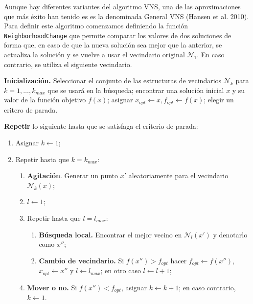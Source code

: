 \documentclass[
]{article}
\providecommand{\tightlist}{%
  \setlength{\itemsep}{0pt}\setlength{\parskip}{0pt}}
\begin{document}
Aunque hay diferentes variantes del algoritmo VNS, una de las
aproximaciones que más éxito han tenido es es la denominada General VNS
(Hansen et al. 2010). Para definir este algoritmo comenzamos definiendo
la función \texttt{NeighborhoodChange} que permite comparar los valores
de dos soluciones de forma que, en caso de que la nueva solución sea
mejor que la anterior, se actualiza la solución y se vuelve a usar el
vecindario original \(\mathcal{N}_1\). En caso contrario, se utiliza el
siguiente vecindario.

\textbf{Inicialización.} Seleccionar el conjunto de las estructuras de
vecindarios \(\mathcal{N}_k\) para \(k=1,\ldots, k_{max}\) que se usará
en la búsqueda; encontrar una solución inicial \(x\) y su valor de la
función objetivo \(f(x)\); asignar
\(x_{opt}\leftarrow x, f_{opt}\leftarrow f(x)\); elegir un critero de
parada.

\textbf{Repetir} lo siguiente hasta que se satisfaga el criterio de
parada:

\begin{enumerate}
\def\labelenumi{(\arabic{enumi})}
\tightlist
\item
  Asignar \(k\leftarrow 1\);
\item
  Repetir hasta que \(k=k_{max}\):

  \begin{enumerate}
  \def\labelenumii{(\alph{enumii})}
  \tightlist
  \item
    \textbf{Agitación}. Generar un punto \(x'\) aleatoriamente para el
    vecindario \(\mathcal{N}_k(x)\);
  \item
    \(l\leftarrow 1\);
  \item
    Repetir hasta que \(l=l_{max}\):

    \begin{enumerate}
    \def\labelenumiii{(\roman{enumiii})}
    \tightlist
    \item
      \textbf{Búsqueda local.} Encontrar el mejor vecino en
      \(\mathcal{N}_l(x')\) y denotarlo como \(x''\);
    \item
      \textbf{Cambio de vecindario.} Si \(f(x'') > f_{opt}\) hacer
      \(f_{opt}\leftarrow f(x'')\), \(x_{opt}\leftarrow x''\) y
      \(l\leftarrow l_{max}\); en otro caso \(l\leftarrow l + 1\);
    \end{enumerate}
  \item
    \textbf{Mover o no.} Si \(f(x'') < f_{opt}\), asignar
    \(k \leftarrow k + 1\); en caso contrario, \(k\leftarrow 1\).
  \end{enumerate}
\end{enumerate}
\end{document}

